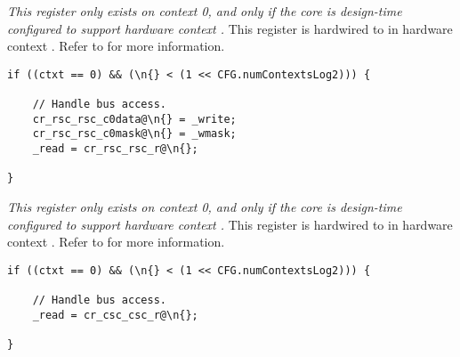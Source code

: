 
\emph{This register only exists on context 0, and only if the core is
design-time configured to support hardware context \n{}.} This register is 
hardwired to  in hardware context \n{}. Refer to  for more
information.

\implementation{}
\begin{lstlisting}
if ((ctxt == 0) && (\n{} < (1 << CFG.numContextsLog2))) {
    
    // Handle bus access.
    cr_rsc_rsc_c0data@\n{} = _write;
    cr_rsc_rsc_c0mask@\n{} = _wmask;
    _read = cr_rsc_rsc_r@\n{};
    
}
\end{lstlisting}


\emph{This register only exists on context 0, and only if the core is
design-time configured to support hardware context \n{}.} This register is 
hardwired to  in hardware context \n{}. Refer to  for more
information.

\implementation{}
\begin{lstlisting}
if ((ctxt == 0) && (\n{} < (1 << CFG.numContextsLog2))) {
    
    // Handle bus access.
    _read = cr_csc_csc_r@\n{};
    
}
\end{lstlisting}


